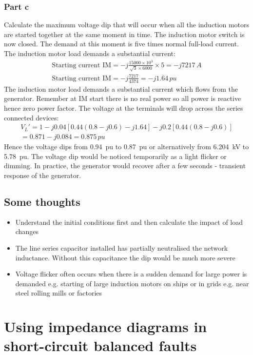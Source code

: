 \subsubsection{Part c}
Calculate the maximum voltage dip that will occur when all the induction motors are started together at the same moment in time. The induction motor switch is now closed. The demand at this moment is five times normal full-load current. The induction motor load demands a substantial current:
\begin{gather}
	\textrm{Starting current IM} = -j\frac{15000 \times 10^3}{\sqrt{3}\times 6000}\times 5 = -j7217\,\si{A}\\
	\textrm{Starting current IM} = -j\frac{7217}{4374} = -j1.64\,\si{pu}
\end{gather}
The induction motor load demands a substantial current which flows from the generator. Remember at IM start there is no real power so all power is reactive hence zero power factor. The voltage at the terminals will drop across the series connected devices:
\begin{gather}
	V_L' = 1-j0.04\left[0.44\left(0.8-j0.6\right)-j1.64\right]-j0.2\left[0.44\left(0.8-j0.6\right)\right]\\
	= 0.871 -j0.084 = 0.875\,\si{pu}
\end{gather}
Hence the voltage dips from \SI{0.94}{pu} to \SI{0.87}{pu} or alternatively from \SI{6.204}{kV} to \SI{5.78}{pu}. The voltage dip would be noticed temporarily as a light flicker or dimming. In practice, the generator would recover after a few seconds - transient response of the generator.
\subsection{Some thoughts}
\begin{itemize}
	\item Understand the initial conditions first and then calculate the impact of load changes
	\item The line series capacitor installed has partially neutralised the network inductance. Without this capacitance the dip would be much more severe
	\item Voltage flicker often occurs when there is a sudden demand for large power is demanded e.g. starting of large induction motors on ships or in grids e.g. near steel rolling mills or factories
\end{itemize}
\section{Using impedance diagrams in short-circuit balanced faults}
